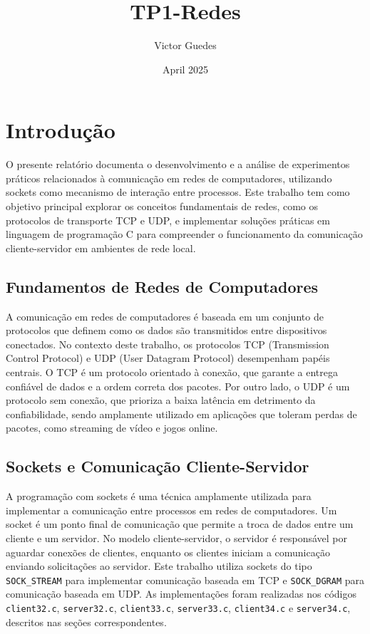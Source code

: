 \documentclass{article}
\title{TP1-Redes}
\author{Victor Guedes}
\date{April 2025}
\begin{document}
\section{Introdução}

O presente relatório documenta o desenvolvimento e a análise de experimentos práticos relacionados à comunicação em redes de computadores, utilizando sockets como mecanismo de interação entre processos. Este trabalho tem como objetivo principal explorar os conceitos fundamentais de redes, como os protocolos de transporte TCP e UDP, e implementar soluções práticas em linguagem de programação C para compreender o funcionamento da comunicação cliente-servidor em ambientes de rede local.

\subsection{Fundamentos de Redes de Computadores}

A comunicação em redes de computadores é baseada em um conjunto de protocolos que definem como os dados são transmitidos entre dispositivos conectados. No contexto deste trabalho, os protocolos TCP (Transmission Control Protocol) e UDP (User Datagram Protocol) desempenham papéis centrais. O TCP é um protocolo orientado à conexão, que garante a entrega confiável de dados e a ordem correta dos pacotes. Por outro lado, o UDP é um protocolo sem conexão, que prioriza a baixa latência em detrimento da confiabilidade, sendo amplamente utilizado em aplicações que toleram perdas de pacotes, como streaming de vídeo e jogos online.

\subsection{Sockets e Comunicação Cliente-Servidor}

A programação com sockets é uma técnica amplamente utilizada para implementar a comunicação entre processos em redes de computadores. Um socket é um ponto final de comunicação que permite a troca de dados entre um cliente e um servidor. No modelo cliente-servidor, o servidor é responsável por aguardar conexões de clientes, enquanto os clientes iniciam a comunicação enviando solicitações ao servidor. Este trabalho utiliza sockets do tipo \texttt{SOCK\_STREAM} para implementar comunicação baseada em TCP e \texttt{SOCK\_DGRAM} para comunicação baseada em UDP. As implementações foram realizadas nos códigos \texttt{client32.c}, \texttt{server32.c}, \texttt{client33.c}, \texttt{server33.c}, \texttt{client34.c} e \texttt{server34.c}, descritos nas seções correspondentes.
\end{document}
